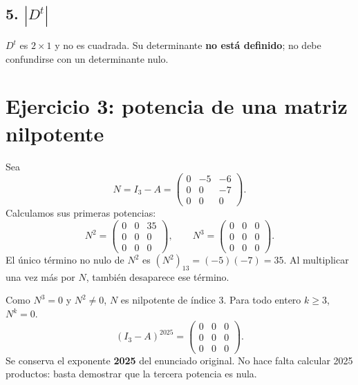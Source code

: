 \documentclass[11pt]{article}
\begin{document}
\subsection*{5. $|D^t|$}
$D^t$ es $2\times1$ y no es cuadrada. Su determinante \textbf{no está definido}; no debe confundirse con un determinante nulo.
\clearpage
\section*{Ejercicio 3: potencia de una matriz nilpotente}
Sea
\[
N=I_3-A=\begin{pmatrix}0&-5&-6\\0&0&-7\\0&0&0\end{pmatrix}.
\]
Calculamos sus primeras potencias:
\[
N^2=\begin{pmatrix}0&0&35\\0&0&0\\0&0&0\end{pmatrix},\qquad
N^3=\begin{pmatrix}0&0&0\\0&0&0\\0&0&0\end{pmatrix}.
\]
El único término no nulo de $N^2$ es $(N^2)_{13}=(-5)(-7)=35$. Al multiplicar una vez más por $N$, también desaparece ese término.

Como $N^3=0$ y $N^2\neq0$, $N$ es nilpotente de índice 3. Para todo entero $k\geq3$, $N^k=0$.
\[
\boxed{(I_3-A)^{2025}=\begin{pmatrix}0&0&0\\0&0&0\\0&0&0\end{pmatrix}}.
\]
Se conserva el exponente \textbf{2025} del enunciado original. No hace falta calcular 2025 productos: basta demostrar que la tercera potencia es nula.
\end{document}
